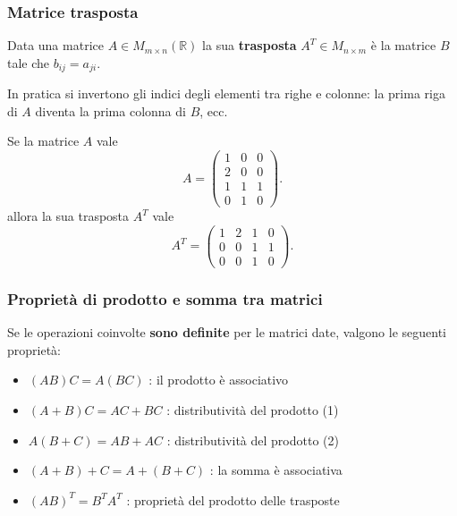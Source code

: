 \documentclass[
  a4paper,
]{article}
\providecommand{\tightlist}{%
  \setlength{\itemsep}{0pt}\setlength{\parskip}{0pt}}
\providecommand{\tightlist}{}
\begin{document}
\hypertarget{matrice-trasposta}{%
\subsubsection{Matrice trasposta}\label{matrice-trasposta}}

\begin{definitionbox}
Data una matrice \(A \in M_{m \times n} (\mathbb{R})\) la sua
\textbf{trasposta} \(A^T \in M_{n \times m}\) è la matrice \(B\) tale
che \(b_{ij} = a_{ji}\).
\end{definitionbox}

In pratica si invertono gli indici degli elementi tra righe e colonne:
la prima riga di \(A\) diventa la prima colonna di \(B\), ecc.

\begin{examplebox}
Se la matrice \(A\) vale \[
A=
\begin{pmatrix}
1 & 0 & 0\\
2 & 0 & 0\\
1 & 1 & 1\\
0 & 1 & 0
\end{pmatrix}.
\] allora la sua trasposta \(A^T\) vale \[
A^{T}=
\begin{pmatrix}
1 & 2 & 1 & 0\\
0 & 0 & 1 & 1\\
0 & 0 & 1 & 0
\end{pmatrix}.
\]
\end{examplebox}

\hypertarget{proprietuxe0-di-prodotto-e-somma-tra-matrici}{%
\subsubsection{Proprietà di prodotto e somma tra
matrici}\label{proprietuxe0-di-prodotto-e-somma-tra-matrici}}

\begin{propositionbox}[Proprietà]
Se le operazioni coinvolte \textbf{sono definite} per le matrici date,
valgono le seguenti proprietà:

\begin{itemize}
\tightlist
\item
  \((AB)C = A(BC)\) : il prodotto è associativo
\item
  \((A+B)C = AC + BC\) : distributività del prodotto (1)
\item
  \(A(B+C) = AB + AC\) : distributività del prodotto (2)
\item
  \((A+B) + C = A + (B+C)\) : la somma è associativa
\item
  \((AB)^T = B^T A^T\) : proprietà del prodotto delle trasposte
\end{itemize}
\end{propositionbox}
\end{document}
